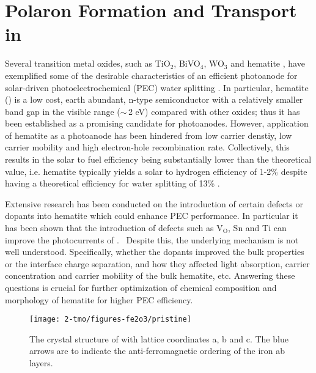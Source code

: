 \def\vo{\text{V}_\text{O}}

\section{Polaron Formation and Transport in }

Several transition metal oxides, such as TiO$_2$, BiVO$_4$, WO$_3$ and hematite , have exemplified some of the desirable characteristics of an efficient photoanode for solar-driven photoelectrochemical (PEC) water splitting \cite{alexander2008metal,sivula2011solar}. In particular, hematite () is a low cost, earth abundant, n-type semiconductor with a relatively smaller band gap in the visible range ($\sim\,$2 eV) compared with other oxides; thus it has been established as a promising candidate for photoanodes. However, application of hematite as a photoanode has been hindered from low carrier denstiy, low carrier mobility and high electron-hole recombination rate. Collectively, this results in the solar to fuel efficiency being substantially lower than the theoretical value, i.e. hematite typically yields a solar to hydrogen efficiency of 1-2\% despite having a theoretical efficiency for water splitting of 13\% \cite{glasscock2007enhancement}.

Extensive research has been conducted on the introduction of certain defects or dopants into hematite which could enhance PEC performance. In particular it has been shown that the introduction of defects such as $\vo$, Sn and Ti can improve the photocurrents of .~\cite{forster2015oxygen,ling2011sn,wang2011facile} Despite this, the underlying mechanism is not well understood. Specifically, whether the dopants improved the bulk properties or the interface charge separation, and how they affected light absorption, carrier concentration and carrier mobility of the bulk hematite, etc. Answering these questions is crucial for further optimization of chemical composition and morphology of hematite for higher PEC efficiency.

\begin{figure}[t!]
\begin{center}
\texttt{[image: 2-tmo/figures-fe2o3/pristine]}
\caption{The crystal structure of  with lattice coordinates a, b and c. The blue arrows are to indicate the anti-ferromagnetic ordering of the iron ab layers.} \label{fe2o3:fig:pristine}
\end{center}
\end{figure}

